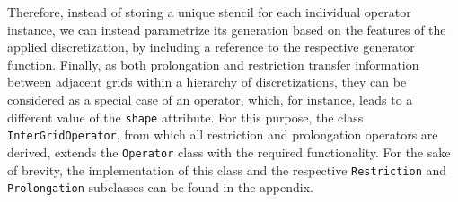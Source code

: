 Therefore, instead of storing a unique stencil for each individual operator instance, we can instead parametrize its generation based on the features of the applied discretization, by including a reference to the respective generator function.
Finally, as both prolongation and restriction transfer information between adjacent grids within a hierarchy of discretizations, they can be considered as a special case of an operator, which, for instance, leads to a different value of the \texttt{shape} attribute.
For this purpose, the class \texttt{InterGridOperator}, from which all restriction and prolongation operators are derived, extends the \texttt{Operator} class with the required functionality.
For the sake of brevity, the implementation of this class and the respective \texttt{Restriction} and \texttt{Prolongation} subclasses can be found in the appendix.

